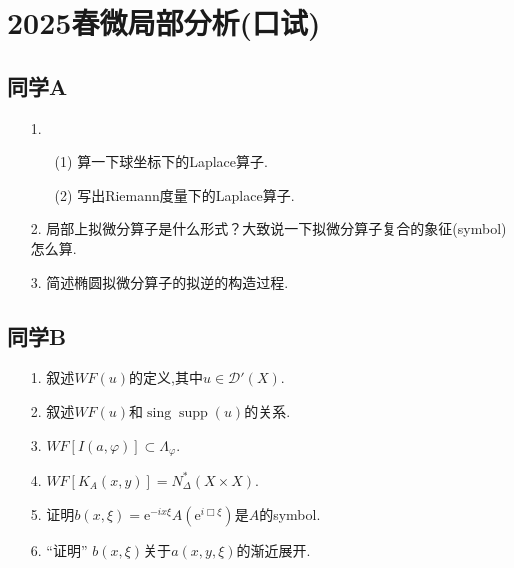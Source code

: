 
\section{2025春微局部分析(口试)}
\subsection{同学A}
\begin{enumerate}
    \item[1.]
    \begin{enumerate}
        \item[(1)]算一下球坐标下的Laplace算子.
        \item[(2)]写出Riemann度量下的Laplace算子.
    \end{enumerate}

    \item[2.]局部上拟微分算子是什么形式？大致说一下拟微分算子复合的象征(symbol)怎么算.

    \item[3.]简述椭圆拟微分算子的拟逆的构造过程.
\end{enumerate}
\subsection{同学B}
\begin{enumerate}
    \item[1.]叙述$WF(u)$的定义,其中$u\in\mathcal{D}'(X)$.

    \item[2.]叙述$WF(u)$和$\operatorname{sing}\operatorname{supp}(u)$的关系.

    \item[3.]$WF[I(a,\varphi)]\subset \Lambda_{\varphi}$.

    \item[4.]$WF[K_A(x,y)]=N^{*}_{\Delta}(X\times X)$.

    \item[5.]证明$b(x,\xi)=\mathrm{e}^{-ix\xi}A(\mathrm{e}^{i\Box\xi})$是$A$的symbol.

    \item[6.]``证明'' $b(x,\xi)$关于$a(x,y,\xi)$的渐近展开.
\end{enumerate}